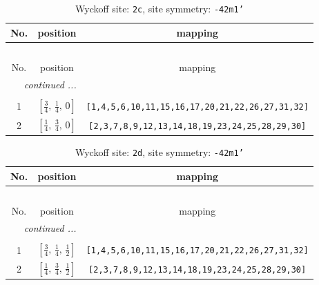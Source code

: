 \documentclass[fleqn,8pt]{jsarticle}
\begin{document}
\renewcommand{\arraystretch}{1.2}
\begin{longtable}{ccc}
\caption{Wyckoff site: {\tt 2c}, site symmetry: {\tt -42m1'}}
 \\
 \hline \hline
No. & position & mapping \\ \hline \endfirsthead

\multicolumn{2}{l}{\tablename\ \thetable{}} \\
 \hline \hline
No. & position & mapping \\ \hline \endhead

 \hline \hline
\multicolumn{2}{r}{\footnotesize\it continued ...} \\ \endfoot

 \hline \hline
\multicolumn{2}{r}{} \\ \endlastfoot

1 & $\left[ \frac{3}{4},\, \frac{1}{4},\, 0 \right]$ & {\tt [1,4,5,6,10,11,15,16,17,20,21,22,26,27,31,32]} \\ \hline
2 & $\left[ \frac{1}{4},\, \frac{3}{4},\, 0 \right]$ & {\tt [2,3,7,8,9,12,13,14,18,19,23,24,25,28,29,30]} \\
\end{longtable}
\renewcommand{\arraystretch}{1.2}
\begin{longtable}{ccc}
\caption{Wyckoff site: {\tt 2d}, site symmetry: {\tt -42m1'}}
 \\
 \hline \hline
No. & position & mapping \\ \hline \endfirsthead

\multicolumn{2}{l}{\tablename\ \thetable{}} \\
 \hline \hline
No. & position & mapping \\ \hline \endhead

 \hline \hline
\multicolumn{2}{r}{\footnotesize\it continued ...} \\ \endfoot

 \hline \hline
\multicolumn{2}{r}{} \\ \endlastfoot

1 & $\left[ \frac{3}{4},\, \frac{1}{4},\, \frac{1}{2} \right]$ & {\tt [1,4,5,6,10,11,15,16,17,20,21,22,26,27,31,32]} \\ \hline
2 & $\left[ \frac{1}{4},\, \frac{3}{4},\, \frac{1}{2} \right]$ & {\tt [2,3,7,8,9,12,13,14,18,19,23,24,25,28,29,30]} \\
\end{longtable}
\renewcommand{\arraystretch}{1.2}
\end{document}
